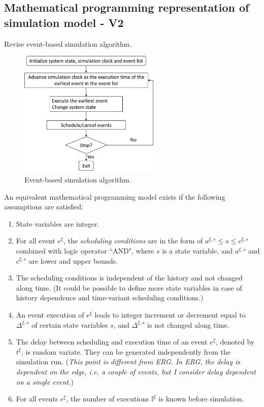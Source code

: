 \documentclass[]{interact}
\theoremstyle{plain}%
\theoremstyle{definition}
\theoremstyle{remark}
\begin{document}
\newpage
\subsection{Mathematical programming representation of simulation model - V2}

Revise event-based simulation algorithm.

\begin{figure}[h]
	\centering
	\includegraphics[width=0.6\textwidth]{Figures/EventSimAlgo.png}
	\caption{Event-based simulation algorithm.}
	\label{fig:EventSimAlgo}
\end{figure}

An equivalent mathematical programming model exists if the following assumptions are satisfied:
\begin{enumerate}
	\item State variables are integer.
	\item For all event $e^{\xi}$, the \textit{scheduling conditions} are in the form of $a^{\xi,s}\le s \le c^{\xi,s}$ combined with logic operator ``AND", where $s$ is a state variable, and $a^{\xi,s}$ and $c^{\xi,s}$ are lower and upper bounds.
	\item The scheduling conditions is independent of the history and not changed along time. (It could be possible to define more state variables in case of history dependence and time-variant scheduling conditions.)
	\item An event execution of $e^{\xi}$ leads to integer increment or decrement equal to $\Delta^{\xi,s}$ of certain state variables $s$, and $\Delta^{\xi,s}$ is not changed along time.
	\item The delay between scheduling and execution time of an event $e^{\xi}$, denoted by $t^{\xi}$, is random variate. They can be generated independently from the simulation run. (\textit{This point is different from ERG. In ERG, the delay is dependent on the edge, i.e, a couple of events, but I consider delay dependent on a single event.})
	\item For all events $e^{\xi}$, the number of executions $\mathbb{I}^{\xi}$ is known before simulation.
\end{enumerate}
\end{document}
